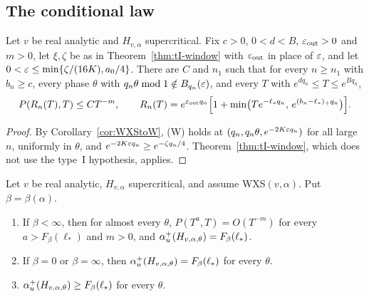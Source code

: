 \subsection{The conditional law}\label{sec:CP}

\begin{theorem}\label{thm:M2CP}
Let $v$ be real analytic and $H_{v,\alpha}$ supercritical. Fix $c>0$, $0<d<B$, $\varepsilon_{\mathrm{out}}>0$ and $m>0$, let $\xi,\zeta$ be as in Theorem~\ref{thm:tI-window} with $\varepsilon_{\mathrm{out}}$ in place of $\varepsilon$, and let $0<\varepsilon\le\min\{\zeta/(16K),a_0/4\}$. There are $C$ and $n_1$ such that for every $n\ge n_1$ with $b_n\ge c$, every phase $\theta$ with $q_n\theta\bmod1\notin B_{q_n}(\varepsilon)$, and every $T$ with $e^{dq_n}\le T\le e^{Bq_n}$,
\[
P(R_n(T),T)\le CT^{-m},\qquad R_n(T)=e^{\varepsilon_{\mathrm{out}}q_n}\Bigl[1+\min\bigl(Te^{-\ell_*q_n},\,e^{(b_n-\ell_*)_+q_n}\bigr)\Bigr].
\]
\end{theorem}

\begin{proof}
By Corollary~\ref{cor:WXStoW}, (W) holds at $(q_n,q_n\theta,e^{-2K\varepsilon q_n})$ for all large $n$, uniformly in $\theta$, and $e^{-2K\varepsilon q_n}\ge e^{-\zeta q_n/4}$. Theorem~\ref{thm:tI-window}, which does not use the type~I hypothesis, applies.
\end{proof}

\begin{theorem}\label{thm:CP}
Let $v$ be real analytic, $H_{v,\alpha}$ supercritical, and assume WXS$(v,\alpha)$. Put $\beta=\beta(\alpha)$.
\begin{enumerate}
\item If $\beta<\infty$, then for almost every $\theta$, $P(T^a,T)=O(T^{-m})$ for every $a>F_\beta(\ell_*)$ and $m>0$, and $\alpha_u^+(H_{v,\alpha,\theta})=F_\beta(\ell_*)$.
\item If $\beta=0$ or $\beta=\infty$, then $\alpha_u^+(H_{v,\alpha,\theta})=F_\beta(\ell_*)$ for every $\theta$.
\item $\alpha_u^+(H_{v,\alpha,\theta})\ge F_\beta(\ell_*)$ for every $\theta$.
\end{enumerate}
\end{theorem}

